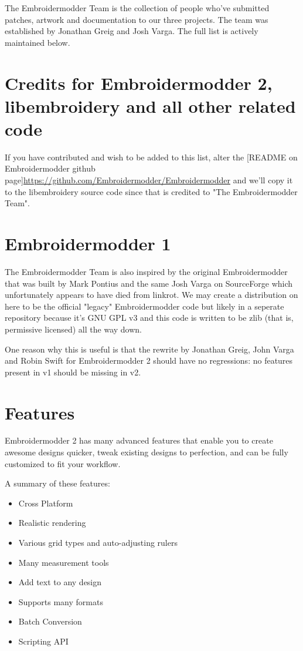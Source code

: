 The Embroidermodder Team is the collection of people who've submitted
patches, artwork and documentation to our three projects.
The team was established by Jonathan Greig and Josh Varga.
The full list is actively maintained below.

\section{Credits for Embroidermodder 2, libembroidery and all other related code}

If you have contributed and wish to be added to this list, alter the [README on Embroidermodder github page]\url{https://github.com/Embroidermodder/Embroidermodder} and we'll copy it to the libembroidery source code since that is credited to "The Embroidermodder Team".

\section{Embroidermodder 1}

The Embroidermodder Team is also inspired by the original Embroidermodder that was built by Mark Pontius and the same Josh Varga on SourceForge which unfortunately appears to have died from linkrot. We may create a distribution on here to be the official "legacy" Embroidermodder code but likely in a seperate repository because it's GNU GPL v3 and this code is written to be zlib (that is, permissive licensed) all the way down.

One reason why this is useful is that the rewrite by Jonathan Greig, John Varga and Robin Swift for Embroidermodder 2 should have no regressions: no features present in v1 should be missing in v2.

\section{Features}

Embroidermodder 2 has many advanced features that enable you to create awesome designs quicker, tweak existing designs to perfection, and can be fully customized to fit your workflow.

A summary of these features:

\begin{itemize}
\item Cross Platform
\item Realistic rendering
\item Various grid types and auto-adjusting rulers
\item Many measurement tools
\item Add text to any design
\item Supports many formats
\item Batch Conversion
\item Scripting API
\end{itemize}


